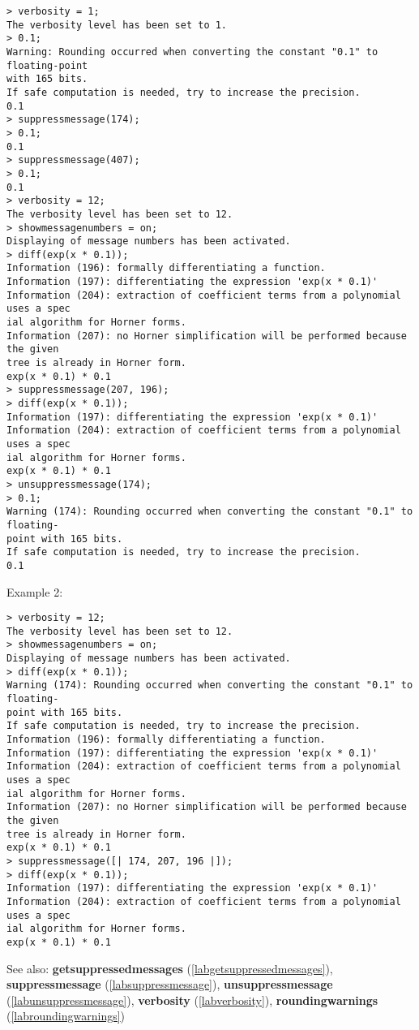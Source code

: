 \begin{center}\begin{minipage}{15cm}\begin{Verbatim}[frame=single]
> verbosity = 1;
The verbosity level has been set to 1.
> 0.1;
Warning: Rounding occurred when converting the constant "0.1" to floating-point 
with 165 bits.
If safe computation is needed, try to increase the precision.
0.1
> suppressmessage(174);
> 0.1;
0.1
> suppressmessage(407);
> 0.1;
0.1
> verbosity = 12;
The verbosity level has been set to 12.
> showmessagenumbers = on;
Displaying of message numbers has been activated.
> diff(exp(x * 0.1));
Information (196): formally differentiating a function.
Information (197): differentiating the expression 'exp(x * 0.1)'
Information (204): extraction of coefficient terms from a polynomial uses a spec
ial algorithm for Horner forms.
Information (207): no Horner simplification will be performed because the given 
tree is already in Horner form.
exp(x * 0.1) * 0.1
> suppressmessage(207, 196);
> diff(exp(x * 0.1));
Information (197): differentiating the expression 'exp(x * 0.1)'
Information (204): extraction of coefficient terms from a polynomial uses a spec
ial algorithm for Horner forms.
exp(x * 0.1) * 0.1
> unsuppressmessage(174);
> 0.1;
Warning (174): Rounding occurred when converting the constant "0.1" to floating-
point with 165 bits.
If safe computation is needed, try to increase the precision.
0.1
\end{Verbatim}
\end{minipage}\end{center}
\noindent Example 2: 
\begin{center}\begin{minipage}{15cm}\begin{Verbatim}[frame=single]
> verbosity = 12;
The verbosity level has been set to 12.
> showmessagenumbers = on; 
Displaying of message numbers has been activated.
> diff(exp(x * 0.1));
Warning (174): Rounding occurred when converting the constant "0.1" to floating-
point with 165 bits.
If safe computation is needed, try to increase the precision.
Information (196): formally differentiating a function.
Information (197): differentiating the expression 'exp(x * 0.1)'
Information (204): extraction of coefficient terms from a polynomial uses a spec
ial algorithm for Horner forms.
Information (207): no Horner simplification will be performed because the given 
tree is already in Horner form.
exp(x * 0.1) * 0.1
> suppressmessage([| 174, 207, 196 |]);
> diff(exp(x * 0.1));
Information (197): differentiating the expression 'exp(x * 0.1)'
Information (204): extraction of coefficient terms from a polynomial uses a spec
ial algorithm for Horner forms.
exp(x * 0.1) * 0.1
\end{Verbatim}
\end{minipage}\end{center}
See also: \textbf{getsuppressedmessages} (\ref{labgetsuppressedmessages}), \textbf{suppressmessage} (\ref{labsuppressmessage}), \textbf{unsuppressmessage} (\ref{labunsuppressmessage}), \textbf{verbosity} (\ref{labverbosity}), \textbf{roundingwarnings} (\ref{labroundingwarnings})

